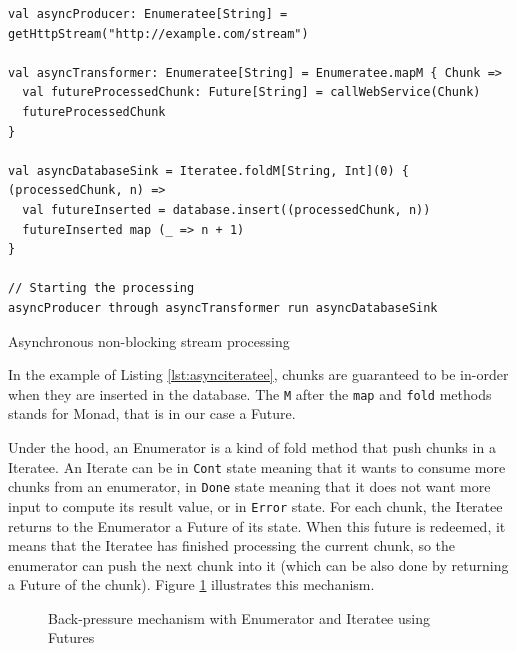 \begin{listing}[h]
\begin{verbatim}
val asyncProducer: Enumeratee[String] = getHttpStream("http://example.com/stream")

val asyncTransformer: Enumeratee[String] = Enumeratee.mapM { Chunk => 
  val futureProcessedChunk: Future[String] = callWebService(Chunk)
  futureProcessedChunk
}

val asyncDatabaseSink = Iteratee.foldM[String, Int](0) { (processedChunk, n) =>
  val futureInserted = database.insert((processedChunk, n))
  futureInserted map (_ => n + 1)
}

// Starting the processing
asyncProducer through asyncTransformer run asyncDatabaseSink
\end{verbatim}
\caption{Asynchronous non-blocking stream processing}
\label{lst:asynciteratee}
\end{listing}

In the example of Listing \ref{lst:asynciteratee}, chunks are guaranteed to be in-order when they are inserted in the database. The \verb|M| after
the \verb|map| and \verb|fold| methods stands for Monad, that is in our case a Future.

Under the hood, an Enumerator is a kind of fold method that push chunks in a Iteratee. An Iterate can be in \verb|Cont| state meaning that it wants to consume more 
chunks from an enumerator, in \verb|Done| state
meaning that it does not want more input to compute its result value, or in \verb|Error| state. For each chunk, the Iteratee returns to the Enumerator
a Future of its state. When this future is redeemed, it means that the Iteratee has finished processing the current chunk, so the enumerator can 
push the next chunk into it (which can be also done by returning a Future of the chunk). Figure \ref{fig:itenum} illustrates this mechanism.

\begin{figure}[h]
  \begin{center} 
    \caption{Back-pressure mechanism with Enumerator and Iteratee using Futures}
    \label{fig:itenum}
  \end{center}
\end{figure}

